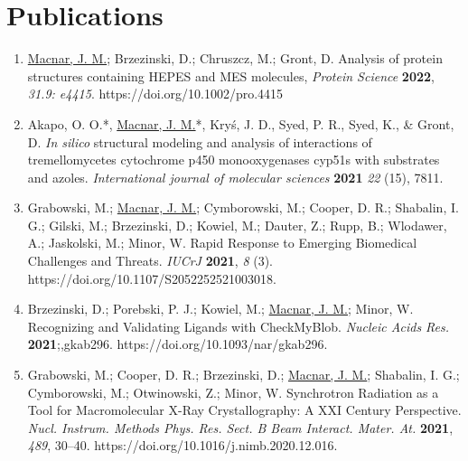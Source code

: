 \documentclass[verylight]{simplehipstercv}
\begin{document}
\begin{paracol}{2}
{\begin{minipage}[t]{0.7\textwidth}
\begin{enumerate}
\end{enumerate}
\end{minipage}


\begin{minipage}[t]{0.7\textwidth}
\section*{Publications}
\begin{enumerate}
    \item \underline{Macnar, J. M.}; Brzezinski, D.; Chruszcz, M.; Gront, D. Analysis of protein structures containing HEPES and MES molecules, \textit{Protein Science} \textbf{2022}, \textit{31.9: e4415}. https://doi.org/10.1002/pro.4415\vspace{-0.4em}
    \item Akapo, O. O.*, \underline{Macnar, J. M.}*, Kryś, J. D., Syed, P. R., Syed, K., \& Gront, D. \emph{In silico} structural modeling and analysis of interactions of tremellomycetes cytochrome p450 monooxygenases cyp51s with substrates and azoles. \textit{International journal of molecular sciences} \textbf{2021} \textit{22} (15), 7811.\vspace{-0.4em}
    \item Grabowski, M.; \underline{Macnar, J. M.}; Cymborowski, M.; Cooper, D. R.; Shabalin, I. G.; Gilski, M.; Brzezinski, D.; Kowiel, M.; Dauter, Z.; Rupp, B.; Wlodawer, A.; Jaskolski, M.; Minor, W. Rapid Response to Emerging Biomedical Challenges and Threats. \textit{IUCrJ} \textbf{2021}, \textit{8} (3). https://doi.org/10.1107/S2052252521003018.\vspace{-0.4em}
    \item Brzezinski, D.; Porebski, P. J.; Kowiel, M.; \underline{Macnar, J. M.}; Minor, W. Recognizing and Validating Ligands with CheckMyBlob. \textit{Nucleic Acids Res.} \textbf{2021};,gkab296. https://doi.org/10.1093/nar/gkab296.\vspace{-0.4em}
    \item Grabowski, M.; Cooper, D. R.; Brzezinski, D.; \underline{Macnar, J. M.}; Shabalin, I. G.; Cymborowski, M.; Otwinowski, Z.; Minor, W. Synchrotron Radiation as a Tool for Macromolecular X-Ray Crystallography: A XXI Century Perspective. \textit{Nucl. Instrum. Methods Phys. Res. Sect. B Beam Interact. Mater. At.} \textbf{2021}, \textit{489}, 30–40. https://doi.org/10.1016/j.nimb.2020.12.016.\vspace{-0.4em}

\end{enumerate}
\end{minipage}}
\end{paracol}
\end{document}
